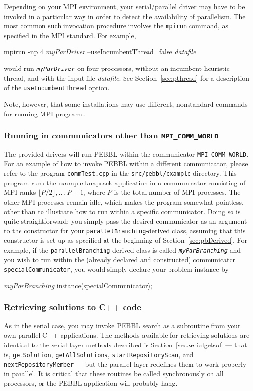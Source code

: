 Depending on your MPI environment, your serial/parallel driver may
have to be invoked in a particular way in order to detect the
availability of parallelism.  The most common such invocation
procedure involves the \texttt{mpirun} command, as specified in the
MPI standard.  For example,
\begin{codeblock}
mpirun -np 4 \emph{myParDriver} --useIncumbentThread=false 
\textrm{\emph{datafile}}
\end{codeblock}
would run \texttt{\emph{myParDriver}} on four processors, without an
incumbent heuristic thread, and with the input file \emph{datafile}.
See Section~\ref{sec:pthread} for a description of the
\texttt{useIncumbentThread} option.

Note, however, that some installations may use different, nonstandard
commands for running MPI programs.

\subsubsection{Running in communicators other than \texttt{MPI\_COMM\_WORLD}}
The provided drivers will run PEBBL within the communicator
\texttt{MPI\_COMM\_WORLD}.  For an example of how to invoke PEBBL within a
different communicator, please refer to
the program \texttt{commTest.cpp} in the
\texttt{src/pebbl/example} directory.  This program runs the example knapsack
application in a communicator consisting of MPI ranks $\lfloor P/2 \rfloor,
\ldots, P-1$, where $P$ is the total number of MPI processes.  The other MPI
processes remain idle, which makes the program somewhat pointless, other than
to illustrate how to run within a specific communicator.  Doing so is quite
straightforward: you simply pass the desired communicator as an argument to
the constructor for your \texttt{parallelBranching}-derived class, assuming
that this constructor is set up as specified at the beginning of
Section~\ref{sec:pbDerived}.  For example, if the
\texttt{parallelBranching}-derived class is called
\emph{\texttt{myParBranching}} and you wish to run within the (already
declared and constructed) communicator \texttt{specialCommunicator}, you would
simply declare your problem instance by
\begin{codeblock}
\emph{myParBranching} instance(specialCommunicator);
\end{codeblock}

\subsubsection{Retrieving solutions to C++ code}
\label{sec:pargetsol}
As in the serial case, you may invoke PEBBL search as a subroutine
from your own parallel C++ applications.  The methods available for
retrieving solutions are identical to the serial layer methods described is
Section~\ref{sec:serialgetsol} --- that is, \texttt{getSolution},
\texttt{getAllSolutions}, \texttt{startRepositoryScan}, and
\texttt{nextRepositoryMember} --- but the parallel layer redefines
them to work properly in parallel.  It is critical that these routines
be called synchronously on all processors, or the PEBBL application
will probably hang.

